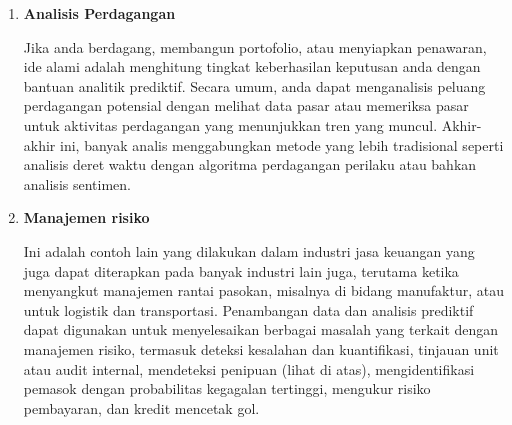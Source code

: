 \begin{enumerate}
\item \textbf{Analisis Perdagangan}
\par Jika anda berdagang, membangun portofolio, atau menyiapkan penawaran, ide alami adalah menghitung tingkat keberhasilan keputusan anda dengan bantuan analitik prediktif. Secara umum, anda dapat menganalisis peluang perdagangan potensial dengan melihat data pasar atau memeriksa pasar untuk aktivitas perdagangan yang menunjukkan tren yang muncul. Akhir-akhir ini, banyak analis menggabungkan metode yang lebih tradisional seperti analisis deret waktu dengan algoritma perdagangan perilaku atau bahkan analisis sentimen.

\item  \textbf{Manajemen risiko}
\par Ini adalah contoh lain yang dilakukan dalam industri jasa keuangan yang juga dapat diterapkan pada banyak industri lain juga, terutama ketika menyangkut manajemen rantai pasokan, misalnya di bidang manufaktur, atau untuk logistik dan transportasi. Penambangan data dan analisis prediktif dapat digunakan untuk menyelesaikan berbagai masalah yang terkait dengan manajemen risiko, termasuk deteksi kesalahan dan kuantifikasi, tinjauan unit atau audit internal, mendeteksi penipuan (lihat di atas), mengidentifikasi pemasok dengan probabilitas kegagalan tertinggi, mengukur risiko pembayaran, dan kredit mencetak gol.

\end{enumerate}
